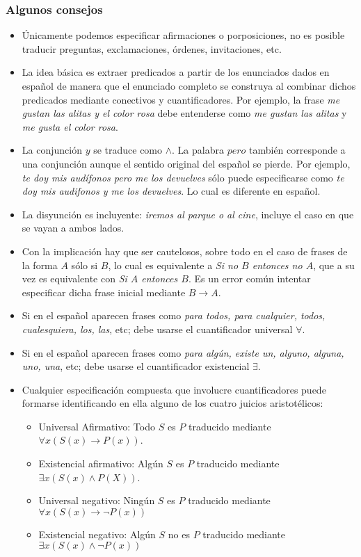 \documentclass[letterpaper,12pt]{article}
\begin{document}
    \subsubsection{Algunos consejos}
    \begin{itemize}
      \item Únicamente podemos especificar afirmaciones o porposiciones, no es 
      posible traducir preguntas, exclamaciones, órdenes, invitaciones, etc.
      \item La idea básica es extraer predicados a partir de los enunciados
      dados en español de manera que el enunciado completo se construya al 
      combinar dichos predicados mediante conectivos y cuantificadores. Por 
      ejemplo, la frase \textit{me gustan las alitas y el color rosa} debe
      entenderse como \textit{me gustan las alitas} y \textit{me gusta el 
      color rosa}. 
      \item La conjunción $y$ se traduce como $\land$. La palabra $pero$ también 
      corresponde a una conjunción aunque el sentido original del español se 
      pierde. Por ejemplo, \textit{te doy mis audífonos pero me los devuelves}
      sólo puede especificarse como \textit{te doy mis audifonos y me los 
      devuelves}. Lo cual es diferente en español.
      \item La disyunción es incluyente: \textit{iremos al parque o al cine},
      incluye el caso en que se vayan a ambos lados.
      \item Con la implicación hay que ser cautelosos, sobre todo en el caso de 
      frases de la forma $A$ sólo si $B$, lo cual es equivalente a 
      \textit{Si no $B$ entonces no $A$}, que a su vez es equivalente con 
      \textit{Si $A$ entonces $B$}. Es un error común intentar especificar dicha
      frase inicial mediante $B \rightarrow A$.
      \item Si en el español aparecen frases como \textit{para todos, para 
      cualquier, todos, cualesquiera, los, las}, etc; debe usarse el 
      cuantificador universal $\forall$.
      \item Si en el español aparecen frases como \textit{para algún, existe un,
      alguno, alguna, uno, una}, etc; debe usarse el cuantificador existencial
      $\exists$.
      \item Cualquier especificación compuesta que involucre cuantificadores
      puede formarse identificando en ella alguno de los cuatro juicios
      aristotélicos:
      \begin{itemize}
        \item Universal Afirmativo: Todo $S$ es $P$ traducido mediante 
        $\forall x(S(x) \rightarrow P(x))$.
        \item Existencial afirmativo: Algún $S$ es $P$ traducido mediante 
        $\exists x (S(x) \land P(X))$.
        \item Universal negativo: Ningún $S$ es $P$ traducido mediante 
        $\forall x (S(x) \rightarrow \neg P(x))$
        \item Existencial negativo: Algún $S$ no es $P$ traducido mediante 
        $\exists x (S(x) \land \neg P(x))$
      \end{itemize}


\end{itemize}
\end{document}
